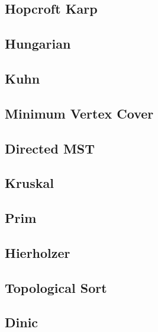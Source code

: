 \subsection{Hopcroft Karp}
\raggedbottom
\hrulefill
\subsection{Hungarian}
\raggedbottom
\hrulefill
\subsection{Kuhn}
\raggedbottom
\hrulefill
\subsection{Minimum Vertex Cover}
\raggedbottom
\hrulefill
\subsection{Directed MST}
\raggedbottom
\hrulefill
\subsection{Kruskal}
\raggedbottom
\hrulefill
\subsection{Prim}
\raggedbottom
\hrulefill
\subsection{Hierholzer}
\raggedbottom
\hrulefill
\subsection{Topological Sort}
\raggedbottom
\hrulefill
\subsection{Dinic}
\raggedbottom
\hrulefill
